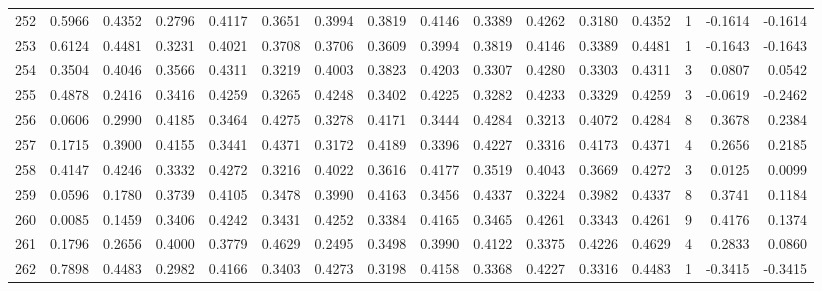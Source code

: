 \begin{tabular}{lrrrrrrrrrrrrrrr}
252 &      0.5966 &  0.4352 &  0.2796 &  0.4117 &  0.3651 &  0.3994 &  0.3819 &  0.4146 &  0.3389 &  0.4262 &   0.3180 &     0.4352 &      1 &                   -0.1614 &                    -0.1614 \\
253 &      0.6124 &  0.4481 &  0.3231 &  0.4021 &  0.3708 &  0.3706 &  0.3609 &  0.3994 &  0.3819 &  0.4146 &   0.3389 &     0.4481 &      1 &                   -0.1643 &                    -0.1643 \\
254 &      0.3504 &  0.4046 &  0.3566 &  0.4311 &  0.3219 &  0.4003 &  0.3823 &  0.4203 &  0.3307 &  0.4280 &   0.3303 &     0.4311 &      3 &                    0.0807 &                     0.0542 \\
255 &      0.4878 &  0.2416 &  0.3416 &  0.4259 &  0.3265 &  0.4248 &  0.3402 &  0.4225 &  0.3282 &  0.4233 &   0.3329 &     0.4259 &      3 &                   -0.0619 &                    -0.2462 \\
256 &      0.0606 &  0.2990 &  0.4185 &  0.3464 &  0.4275 &  0.3278 &  0.4171 &  0.3444 &  0.4284 &  0.3213 &   0.4072 &     0.4284 &      8 &                    0.3678 &                     0.2384 \\
257 &      0.1715 &  0.3900 &  0.4155 &  0.3441 &  0.4371 &  0.3172 &  0.4189 &  0.3396 &  0.4227 &  0.3316 &   0.4173 &     0.4371 &      4 &                    0.2656 &                     0.2185 \\
258 &      0.4147 &  0.4246 &  0.3332 &  0.4272 &  0.3216 &  0.4022 &  0.3616 &  0.4177 &  0.3519 &  0.4043 &   0.3669 &     0.4272 &      3 &                    0.0125 &                     0.0099 \\
259 &      0.0596 &  0.1780 &  0.3739 &  0.4105 &  0.3478 &  0.3990 &  0.4163 &  0.3456 &  0.4337 &  0.3224 &   0.3982 &     0.4337 &      8 &                    0.3741 &                     0.1184 \\
260 &      0.0085 &  0.1459 &  0.3406 &  0.4242 &  0.3431 &  0.4252 &  0.3384 &  0.4165 &  0.3465 &  0.4261 &   0.3343 &     0.4261 &      9 &                    0.4176 &                     0.1374 \\
261 &      0.1796 &  0.2656 &  0.4000 &  0.3779 &  0.4629 &  0.2495 &  0.3498 &  0.3990 &  0.4122 &  0.3375 &   0.4226 &     0.4629 &      4 &                    0.2833 &                     0.0860 \\
262 &      0.7898 &  0.4483 &  0.2982 &  0.4166 &  0.3403 &  0.4273 &  0.3198 &  0.4158 &  0.3368 &  0.4227 &   0.3316 &     0.4483 &      1 &                   -0.3415 &                    -0.3415 \\

\end{tabular}
